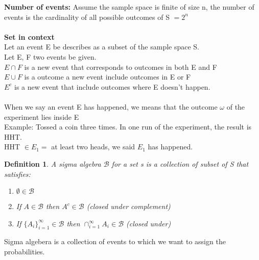 \documentclass[11pt,oneside]{book}
\theoremstyle{break}
\theoremstyle{break}
\newtheorem{defn}{Definition}[corL]
\newcommand{\example}{\color{green}Example: \color{black}}
\begin{document}
	\textbf{Number of events:} Assume the sample space is finite of size n, the number of events is the cardinality of all possible outcomes of S $=2^n$\\
	\hfill\\
	\textbf{Set in context}\\
	Let an event E be describes as a subset of the sample space S.\\
	Let E, F two events be given.\\
	$E\cap F$ is a new event that corresponds to outcomes in both E and F\\
	$E\cup F$ is a outcome a new event include outcomes in E or F\\
	$E^c$ is a new event that include outcomes where E doesn't happen.\\
	\hfill\\
	When we say an event E has happened, we means that the outcome $\omega$ of the experiment lies inside E\\
	\example Tossed a coin three times. In one run of the experiment, the result is HHT.\\
	HHT $\in E_1=$ at least two heads, we said $E_1$ has happened.\\
	\begin{defn}
	A sigma algebra $\mathcal{B}$ for a set s is a collection of subset of S that satisfies:\begin{enumerate}
	\item $\emptyset \in \mathcal{B}$
	\item If $A\in \mathcal{B}$ then $A^c\in \mathcal{B}$ (closed under complement)
	\item If $\{A_i\}_{i=1}^{\infty} \in \mathcal{B}$ then $\cap_{i=1}^{\infty} A_i \in \mathcal{B}$ (closed under)
	\end{enumerate}
	\end{defn}
	\newpage
	Sigma algebera is a collection of events to which we want to assign the probabilities.
\end{document}

